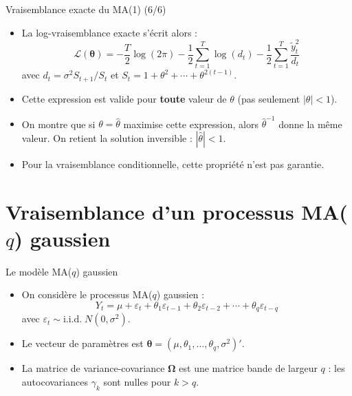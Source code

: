 \documentclass[11pt,aspectratio=169]{beamer}
\begin{document}
\begin{frame}{Vraisemblance exacte du MA(1) (6/6)}

\begin{itemize}

\item La log-vraisemblance exacte s'écrit alors :
  \[
  \boxed{\mathcal{L}(\bm{\theta}) = -\frac{T}{2}\log(2\pi) - \frac{1}{2}\sum_{t=1}^{T}\log(d_t) - \frac{1}{2}\sum_{t=1}^{T}\frac{\tilde{y}_t^2}{d_t}}
  \]
  avec $d_t = \sigma^2 S_{t+1}/S_t$ et $S_t = 1 + \theta^2 + \cdots + \theta^{2(t-1)}$.\newline

\item Cette expression est valide pour \textbf{toute} valeur de $\theta$ (pas seulement $|\theta| < 1$).\newline

\item On montre que si $\theta = \hat{\theta}$ maximise cette expression, alors $\hat{\theta}^{-1}$ donne la même valeur. On retient la solution inversible : $|\hat{\theta}| < 1$.\newline

\item Pour la vraisemblance conditionnelle, cette propriété n'est pas garantie.

\end{itemize}

\end{frame}

\section{Vraisemblance d'un processus MA($q$) gaussien}

\begin{frame}{Le modèle MA($q$) gaussien}

\begin{itemize}

\item On considère le processus MA($q$) gaussien :
  \[
  Y_t = \mu + \varepsilon_t + \theta_1 \varepsilon_{t-1} + \theta_2 \varepsilon_{t-2} + \cdots + \theta_q \varepsilon_{t-q}
  \]
  avec $\varepsilon_t \sim \text{i.i.d.}\; N(0, \sigma^2)$.\newline

\item Le vecteur de paramètres est $\bm{\theta} = (\mu, \theta_1, \ldots, \theta_q, \sigma^2)'$.\newline

\item La matrice de variance-covariance $\bm{\Omega}$ est une matrice bande de largeur $q$ :
  les autocovariances $\gamma_k$ sont nulles pour $k > q$.

\end{itemize}

\end{frame}
\end{document}
